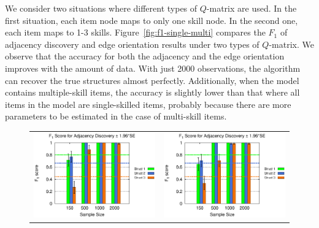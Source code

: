 \documentclass{edm_template}
\begin{document}
	We consider two situations where different types of $Q$-matrix are used. In the first situation,
	each item node maps to only one skill node. In the second one, each item maps to 1-3 skills. 
	Figure~\ref{fig:f1-single-multi} compares the $F_1$ of adjacency discovery and edge orientation results under two types of $Q$-matrix.
	We observe that the accuracy for both the adjacency and the edge orientation  improves with the amount of data.
	With just 2000 observations, the algorithm can recover the true structures almost perfectly.
	Additionally, when the model contains multiple-skill items, the accuracy is slightly lower than that where all items in the model are single-skilled items,
	probably because there are more parameters to be estimated in the case of multi-skill items. 
	
	\begin{figure}[!ht]
		\begin{center}
			\begin{tabular}{>{\centering}m{1.5in} >{\centering\arraybackslash}m{1.5in}}
				\includegraphics[width=1.1\linewidth]{figures/F1A_single.eps} &\includegraphics[width=1.1\linewidth]{figures/F1A_multi.eps}\\

\end{tabular}
\end{center}
\end{figure}
\end{document}
